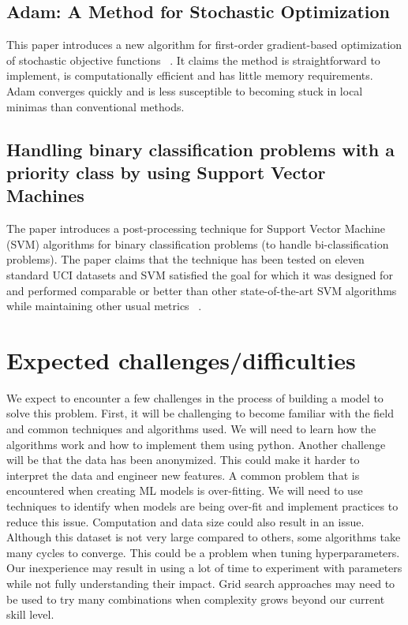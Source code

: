 \documentclass{llncs}
\begin{document}
\subsection{Adam: A Method for Stochastic Optimization}
This paper introduces a new algorithm for first-order gradient-based optimization of stochastic objective functions ~\cite{ref_article2}. It claims the method is straightforward to implement, is computationally efficient and has little memory requirements. Adam converges quickly and is less susceptible to becoming stuck in local minimas than conventional methods.


\subsection{Handling binary classification problems with a priority class by using Support Vector Machines}
The paper introduces a post-processing technique for Support Vector Machine (SVM) algorithms for binary classification problems (to handle bi-classification problems). The paper claims that the technique has been tested on eleven standard UCI datasets and SVM satisfied the goal for which it was designed for and performed comparable or better than other state-of-the-art SVM algorithms while maintaining other usual metrics ~\cite{ref_article4}.

\section{Expected challenges/difficulties}
We expect to encounter a few challenges in the process of building a model to solve this problem. First, it will be challenging to become familiar with the field and common techniques and algorithms used. We will need to learn how the algorithms work and how to implement them using python. Another challenge will be that the data has been anonymized. This could make it harder to interpret the data and engineer new features. A common problem that is encountered when creating ML models is over-fitting. We will need to use techniques to identify when models are being over-fit and implement practices to reduce this issue. Computation and data size could also result in an issue. Although this dataset is not very large compared to others, some algorithms take many cycles to converge. This could be a problem when tuning hyperparameters. Our inexperience may result in using a lot of time to experiment with parameters while not fully understanding their impact. Grid search approaches may need to be used to try many combinations when complexity grows beyond our current skill level.
\end{document}
